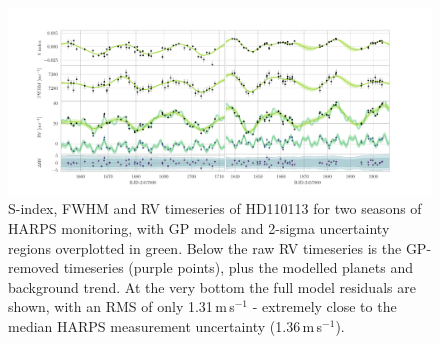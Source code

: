 \documentclass[fleqn,usenatbib]{mnras}
\newcommand{\ms}{m\,s$^{-1}$}
\newcommand{\TSindexperiod}{ $ 39.0 \pm 11.0 $ }
\begin{document}

\begin{figure}
	\includegraphics[width=\textwidth, trim={0.85cm 0.8 1.9cm 0.4cm}]{Combined_RV_plots_3_GPs_final.pdf}
    \caption{S-index, FWHM and RV timeseries of HD110113 for two seasons of HARPS monitoring, with GP models and 2-sigma uncertainty regions overplotted in green. Below the raw RV timeseries is the GP-removed timeseries (purple points), plus the modelled planets and background trend. At the very bottom the full model residuals are shown, with an RMS of only 1.31\,\ms{} - extremely close to the median HARPS measurement uncertainty (1.36\,\ms{}).}
    \label{fig:RVs}
\end{figure}
\end{document}
